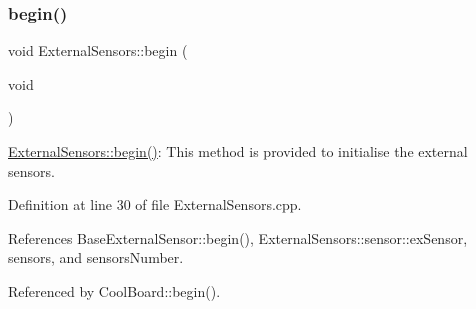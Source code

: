 \subsubsection{\texorpdfstring{begin()}{begin()}}
{\footnotesize\ttfamily void External\+Sensors\+::begin (\begin{DoxyParamCaption}\item[{void}]{ }\end{DoxyParamCaption})}

\hyperlink{classExternalSensors_a58ede0d786a86417254708870f04a21e}{External\+Sensors\+::begin()}\+: This method is provided to initialise the external sensors. 

Definition at line 30 of file External\+Sensors.\+cpp.



References Base\+External\+Sensor\+::begin(), External\+Sensors\+::sensor\+::ex\+Sensor, sensors, and sensors\+Number.



Referenced by Cool\+Board\+::begin().



